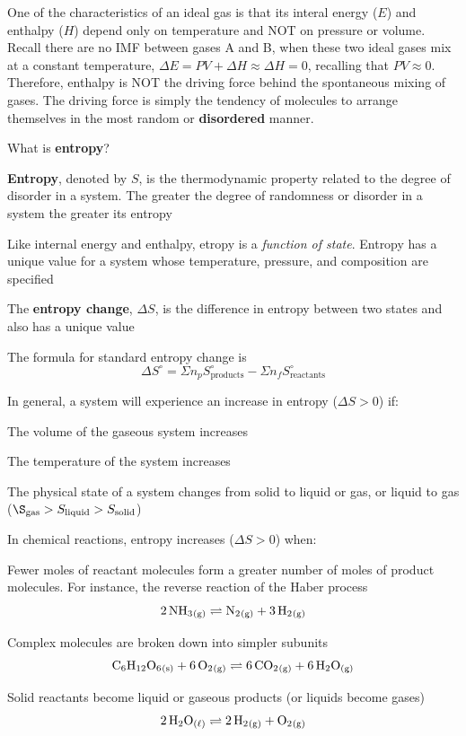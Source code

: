 \begin{important}
    One of the characteristics of an ideal gas is that its interal energy ($E$) and enthalpy
    ($H$) depend only on temperature and NOT on pressure or volume. Recall there are no IMF 
    between gases A and B, when these two ideal gases mix at a constant temperature, 
    $\Delta E=PV+\Delta H\approx\Delta H=0$, recalling that $PV\approx 0$. Therefore, enthalpy
    is NOT the driving force behind the spontaneous mixing of gases. The driving force is simply
    the tendency of molecules to arrange themselves in the most random or \textbf{disordered} manner.
\end{important}

What is \textbf{entropy}?
\begin{bulleted-list}
    \item \textbf{Entropy}, denoted by $S$, is the thermodynamic property related to the
        degree of disorder in a system. The greater the degree of randomness or disorder in a system
        the greater its entropy
    \item Like internal energy and enthalpy, etropy is a \textit{function of state}. Entropy has
        a unique value for a system whose temperature, pressure, and composition are specified
    \item The \textbf{entropy change}, $\Delta S$, is the difference in entropy between two states
        and also has a unique value
    \item The formula for standard entropy change is
        \[
            \Delta S^{\circ}=\Sigma n_pS^{\circ}_\text{products}-\Sigma n_fS^{\circ}_\text{reactants}
        \]
\end{bulleted-list}

In general, a system will experience an increase in entropy ($\Delta S>0$) if:
\begin{bulleted-list}
    \item The volume of the gaseous system increases
    \item The temperature of the system increases
    \item The physical state of a system changes from solid to liquid or gas, or liquid to gas
        ($\S_\mathrm{gas}>S_\mathrm{liquid}>S_\mathrm{solid}$)
\end{bulleted-list}

In chemical reactions, entropy increases ($\Delta S>0$) when:
\begin{bulleted-list}
    \item Fewer moles of reactant molecules form a greater number of moles of product molecules.
        For instance, the reverse reaction of the Haber process
        \[
            \ch{2NH3_{(g)}}\rightleftharpoons \ch{N2_{(g)}}+\ch{3H2_{(g)}}
        \]
    \item Complex molecules are broken down into simpler subunits
        \[
            \ch{C6H12O6_{(s)}}+\ch{6O2_{(g)}}\rightleftharpoons \ch{6CO2_{(g)}}+\ch{6H2O_{(g)}}
        \]
    \item Solid reactants become liquid or gaseous products (or liquids become gases)
        \[
            \ch{2H2O_{(\ell)}}\rightleftharpoons \ch{2H2_{(g)}}+\ch{O2_{(g)}}
        \]
\end{bulleted-list}

